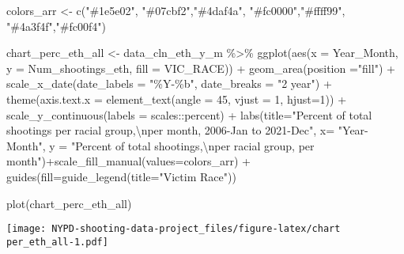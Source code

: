 \documentclass[
]{article}
\newenvironment{Shaded}{\begin{snugshade}}{\end{snugshade}}
\newcommand{\AttributeTok}[1]{\textcolor[rgb]{0.77,0.63,0.00}{#1}}
\newcommand{\DecValTok}[1]{\textcolor[rgb]{0.00,0.00,0.81}{#1}}
\newcommand{\FunctionTok}[1]{\textcolor[rgb]{0.00,0.00,0.00}{#1}}
\newcommand{\NormalTok}[1]{#1}
\newcommand{\OtherTok}[1]{\textcolor[rgb]{0.56,0.35,0.01}{#1}}
\newcommand{\SpecialCharTok}[1]{\textcolor[rgb]{0.00,0.00,0.00}{#1}}
\newcommand{\StringTok}[1]{\textcolor[rgb]{0.31,0.60,0.02}{#1}}
\begin{document}
\begin{Shaded}
\begin{Highlighting}[]
\NormalTok{colors\_arr }\OtherTok{\textless{}{-}} \FunctionTok{c}\NormalTok{(}\StringTok{"\#1e5e02"}\NormalTok{, }\StringTok{"\#07cbf2"}\NormalTok{,}\StringTok{"\#4daf4a"}\NormalTok{, }\StringTok{"\#fc0000"}\NormalTok{,}\StringTok{"\#ffff99"}\NormalTok{, }\StringTok{"\#4a3f4f"}\NormalTok{,}\StringTok{"\#fc00f4"}\NormalTok{)}

\NormalTok{chart\_perc\_eth\_all }\OtherTok{\textless{}{-}}\NormalTok{ data\_cln\_eth\_y\_m }\SpecialCharTok{\%\textgreater{}\%} \FunctionTok{ggplot}\NormalTok{(}\FunctionTok{aes}\NormalTok{(}\AttributeTok{x =}\NormalTok{ Year\_Month, }\AttributeTok{y =}\NormalTok{ Num\_shootings\_eth, }\AttributeTok{fill =}\NormalTok{ VIC\_RACE)) }\SpecialCharTok{+} \FunctionTok{geom\_area}\NormalTok{(}\AttributeTok{position =}\StringTok{"fill"}\NormalTok{) }\SpecialCharTok{+} \FunctionTok{scale\_x\_date}\NormalTok{(}\AttributeTok{date\_labels =} \StringTok{"\%Y{-}\%b"}\NormalTok{, }\AttributeTok{date\_breaks =} \StringTok{"2 year"}\NormalTok{) }\SpecialCharTok{+} \FunctionTok{theme}\NormalTok{(}\AttributeTok{axis.text.x =} \FunctionTok{element\_text}\NormalTok{(}\AttributeTok{angle =} \DecValTok{45}\NormalTok{, }\AttributeTok{vjust =} \DecValTok{1}\NormalTok{, }\AttributeTok{hjust=}\DecValTok{1}\NormalTok{)) }\SpecialCharTok{+} \FunctionTok{scale\_y\_continuous}\NormalTok{(}\AttributeTok{labels =}\NormalTok{ scales}\SpecialCharTok{::}\NormalTok{percent) }\SpecialCharTok{+} \FunctionTok{labs}\NormalTok{(}\AttributeTok{title=}\StringTok{"Percent of total shootings per racial group,}\SpecialCharTok{\textbackslash{}n}\StringTok{per month, 2006{-}Jan to 2021{-}Dec"}\NormalTok{, }\AttributeTok{x=} \StringTok{"Year{-}Month"}\NormalTok{, }\AttributeTok{y =} \StringTok{"Percent of total shootings,}\SpecialCharTok{\textbackslash{}n}\StringTok{per racial group, per month"}\NormalTok{)}\SpecialCharTok{+}\FunctionTok{scale\_fill\_manual}\NormalTok{(}\AttributeTok{values=}\NormalTok{colors\_arr) }\SpecialCharTok{+} \FunctionTok{guides}\NormalTok{(}\AttributeTok{fill=}\FunctionTok{guide\_legend}\NormalTok{(}\AttributeTok{title=}\StringTok{"Victim Race"}\NormalTok{))}

\FunctionTok{plot}\NormalTok{(chart\_perc\_eth\_all)}
\end{Highlighting}
\end{Shaded}

\texttt{[image: NYPD-shooting-data-project\_files/figure-latex/chart per\_eth\_all-1.pdf]}
\end{document}
